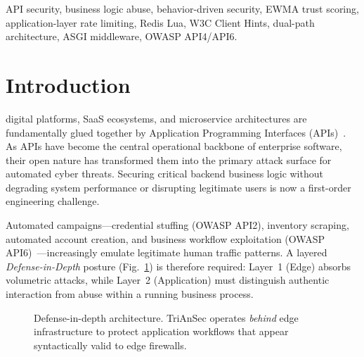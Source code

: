 \documentclass[journal,10pt]{IEEEtran}
\begin{document}
\begin{IEEEkeywords}
API security, business logic abuse, behavior-driven security, EWMA trust scoring, application-layer rate limiting, Redis Lua, W3C Client Hints, dual-path architecture, ASGI middleware, OWASP API4/API6.
\end{IEEEkeywords}

\section{Introduction}
 digital platforms, SaaS ecosystems, and microservice architectures are fundamentally glued together by Application Programming Interfaces (APIs)~\cite{nist2020}. As APIs have become the central operational backbone of enterprise software, their open nature has transformed them into the primary attack surface for automated cyber threats. Securing critical backend business logic without degrading system performance or disrupting legitimate users is now a first-order engineering challenge.

Automated campaigns---credential stuffing (OWASP API2), inventory scraping, automated account creation, and business workflow exploitation (OWASP API6)~\cite{owasp2023}---increasingly emulate legitimate human traffic patterns. A layered \emph{Defense-in-Depth} posture (Fig.~\ref{fig:layered}) is therefore required: Layer~1 (Edge) absorbs volumetric attacks, while Layer~2 (Application) must distinguish authentic interaction from abuse within a running business process.

\begin{figure}[!t]
\centering
{}
\caption{Defense-in-depth architecture. TriAnSec operates \emph{behind} edge infrastructure to protect application workflows that appear syntactically valid to edge firewalls.}
\label{fig:layered}
\end{figure}
\end{document}
